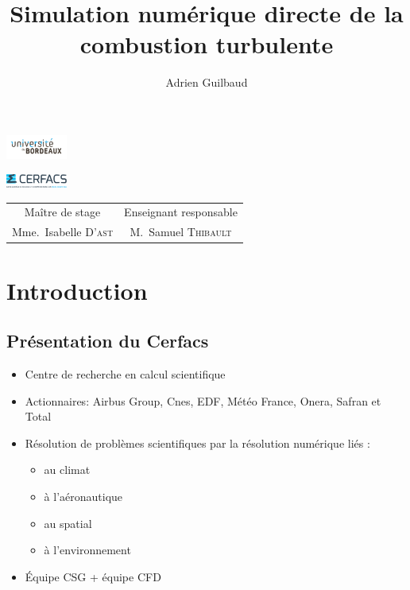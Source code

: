 \documentclass{beamer}
\author{Adrien Guilbaud}
\title{Simulation numérique directe de la combustion turbulente}
\begin{document}

\begin{frame}[plain]
    \parbox[c]{-50cm}{\centering%
      \includegraphics[width=2cm]{figures/logo_fac.jpg}%
    }%
    \parbox[c]{19.5cm}{\centering%
      \includegraphics[width=2cm]{figures/logo_cerfacs.eps}
    }%
\maketitle

\centering
\footnotesize
\begin{tabular}{cc}
  Maître de stage & Enseignant responsable \\
  Mme.~Isabelle \textsc{D'ast} &   M.~Samuel \textsc{Thibault} \\
\end{tabular}
\end{frame}

%
%

\section{Introduction}
\subsection{Présentation du Cerfacs}
\begin{frame}
  \begin{itemize}
  \item Centre de recherche en calcul scientifique
  \item Actionnaires: Airbus Group, Cnes, EDF, Météo France, Onera, Safran et Total
    
  \item Résolution de problèmes scientifiques par la résolution numérique liés :
    \begin{itemize}
    \item au climat
    \item à l'aéronautique
    \item au spatial
    \item à l'environnement
    \end{itemize}
  \item Équipe CSG + équipe CFD
  \end{itemize}
\end{frame}
\end{document}

